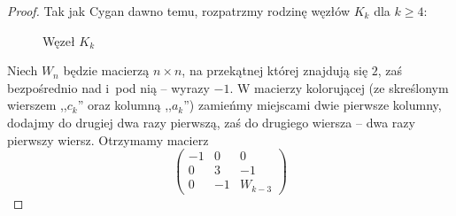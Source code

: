 \begin{proof}
    Tak jak Cygan dawno temu, rozpatrzmy rodzinę węzłów $K_k$ dla $k \ge 4$:
%

\begin{figure}[H]
    \centering
    \begin{comment}
    \begin{tikzpicture}[baseline=-0.65ex, scale=0.1]
    \useasboundingbox (-20, -13) rectangle (40, 13);
    \begin{knot}[clip width=5, end tolerance=1pt, flip crossing/.list={1,2,3,6}]
        \strand[ultra thick] (-10, +3) .. controls (-4, +3) and (-4, -3) .. (0, -3);
        \strand[ultra thick] (-10, -3) .. controls (-4, -3) and (-4, +3) .. (0, +3);
        \node at (5, 0) {$\ldots$};
        \strand[ultra thick] (10+10, +3) .. controls (10+ 4, +3) and (10+ 4, -3) .. (10+0, -3);
        \strand[ultra thick] (10+ 10, -3) .. controls (10+ 4, -3) and (10+4, +3) .. (10+0, +3);
        \strand[ultra thick] (20+10, +3) .. controls (20+ 4, +3) and (20+ 4, -3) .. (20+0, -3);
        \strand[ultra thick] (20+ 10, -3) .. controls (20+ 4, -3) and (20+4, +3) .. (20+0, +3);
        \strand[ultra thick] (30, 3) [in=up, out=right] to (35, -3);
        \strand[ultra thick] (30, -3) [in=down, out=right] to (35, 3);
        \strand[ultra thick] (35, 3) [in=right, out=up] to (0, 10);
        \strand[ultra thick] (35, -3) [in=right, out=down] to (0, -10);
        \strand[ultra thick] (-10, -3) [in=down, out=left] to (-20, 0) to [in=left, out=up] (-10, 3);
        \strand[ultra thick] (-15, 5) [in=left, out=up] to (0, 10);
        \strand[ultra thick] (-15, 5) to (-15, -5) [in=left, out=down] to (0, -10);
        \node at (-5, -5) {$c_3$};
        \node at (15, -5) {$c_{k-2}$};
        \node at (25, -5) {$c_{k-1}$};
    \end{knot}
    \end{tikzpicture}
\end{comment}
    \caption[caption-cygan]{Węzeł $K_k$}
\end{figure}

    Niech $W_n$ będzie macierzą $n \times n$, na przekątnej której znajdują się $2$, zaś bezpośrednio nad i~pod nią -- wyrazy $-1$.
    W macierzy kolorującej (ze skreślonym wierszem ,,$c_k$'' oraz kolumną ,,$a_k$'') zamieńmy miejscami dwie pierwsze kolumny, dodajmy do drugiej dwa razy pierwszą, zaś do drugiego wiersza -- dwa razy pierwszy wiersz.
    Otrzymamy macierz
    \begin{equation}
        \begin{pmatrix}
            -1 & 0 & 0 \\
            0 & 3 & -1 \\
            0 & -1 & W_{k-3}
        \end{pmatrix}
    \end{equation}


\end{proof}
